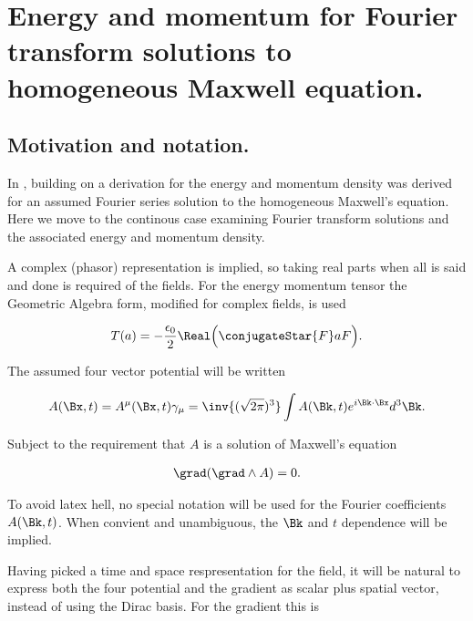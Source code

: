 

\chapter{Energy and momentum for Fourier transform solutions to homogeneous Maxwell equation.}
\label{chap:ftMaxVacuum}
\date{Dec 21, 2009}

\beginArtNoToc

\section{Motivation and notation.}

In , building on \cite{complexFieldEnergy} a derivation for the energy and momentum density was derived for an assumed Fourier series solution to the homogeneous Maxwell's equation.  Here we move to the continous case examining Fourier transform solutions and the associated energy and momentum density.

A complex (phasor) representation is implied, so taking real parts when all is said and done is required of the fields.  For the energy momentum tensor the Geometric Algebra form, modified for complex fields, is used

\begin{align}\label{eqn:ftMaxVacuum:1}
T(a) = -\frac{\epsilon_0}{2} \Real \Bigl( \conjugateStar{F} a F \Bigr).
\end{align}

The assumed four vector potential will be written

\begin{align}\label{eqn:ftMaxVacuum:2}
A(\Bx, t) = A^\mu(\Bx, t) \gamma_\mu = \inv{(\sqrt{2 \pi})^3} \int A(\Bk, t) e^{i \Bk \cdot \Bx } d^3 \Bk.
\end{align}

Subject to the requirement that $A$ is a solution of Maxwell's equation

\begin{align}\label{eqn:ftMaxVacuum:3}
\grad (\grad \wedge A) = 0.
\end{align}

To avoid latex hell, no special notation will be used for the Fourier coefficients $A(\Bk, t)$.  When convient and unambiguous, the $\Bk$ and $t$ dependence will be implied.

Having picked a time and space respresentation for the field, it will be natural to express both the four potential and the gradient as scalar plus spatial vector, instead of using the Dirac basis.  For the gradient this is

